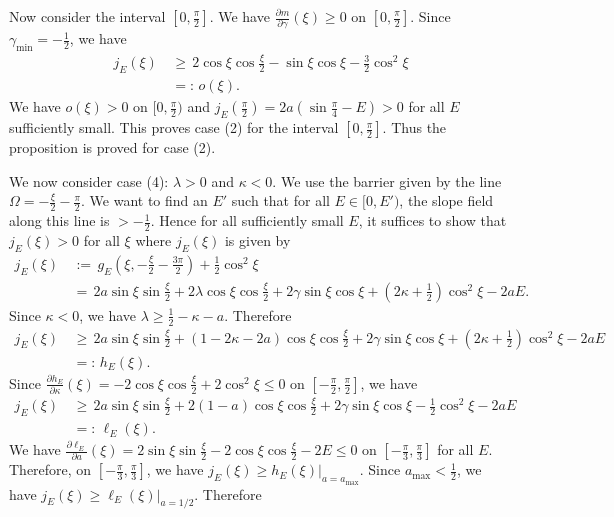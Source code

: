 \documentclass[11 pt]{article}
\renewcommand\l{\lambda}
\renewcommand\({\left(}
\renewcommand\){\right)}
\newcommand\<{\langle}
\renewcommand\>{\rangle}
\renewcommand\l{\lambda}
\newcommand\g{\gamma}
\newcommand\8{\infty}
\newcommand{\pd}{\partial}
\begin{document}
Now consider the interval $[0, \frac{\pi}{2}]$. We have $\frac{\pd m}{\pd \g}(\xi) \geq 0$ on $[0, \frac{\pi}{2}]$. Since $\g_{\text{min}} = -\frac{1}{2}$, we have
\begin{align*}
j_E(\xi) \,&\geq\,2\cos\xi \cos\frac{\xi}{2} - \sin \xi \cos \xi - \frac{3}{2}\cos^2\xi
\\
&=:\, o(\xi). 
\end{align*}
We have $o(\xi) > 0$ on $[0, \frac{\pi}{2})$ and $j_E(\frac{\pi}{2}) = 2a(\sin\frac{\pi}{4}-E) > 0$ for all $E$ sufficiently small. This proves case (2) for the interval $[0, \frac{\pi}{2}]$. Thus the proposition is proved for case (2).

We now consider case (4): $\l > 0$ and $\kappa < 0$. We  use the barrier given by the line $\Omega = -\frac{\xi}{2} - \frac{\pi}{2}$. We want to find an $E'$ such that for all $E \in [0,E')$, the slope field along this line is $>- \frac{1}{2}$. Hence for all sufficiently small $E$, it suffices to show that $j_E(\xi) > 0$ for all $\xi$ where $j_E(\xi)$ is given by    
\begin{align*}
j_E(\xi) \,&:=\, g_E\left(\xi, -\frac{\xi}{2} - \frac{3\pi}{2}\right) + \frac{1}{2}\cos^2\xi
\\
&=\, 2a\sin\xi \sin \frac{\xi}{2} + 2\l \cos \xi \cos \frac{\xi}{2} + 2\gamma\sin \xi \cos\xi + (2\kappa + \frac{1}{2})\cos^2\xi -2aE.
\end{align*}
Since $\kappa < 0$, we have $\l \geq \frac{1}{2} - \kappa - a$.  Therefore
\begin{align*}
j_E(\xi) \,&\geq\, 2a\sin \xi \sin \frac{\xi}{2} + (1 - 2\kappa - 2a) \cos \xi \cos \frac{\xi}{2} + 2\gamma \sin \xi \cos \xi + (2\kappa + \frac{1}{2})\cos^2 \xi - 2aE
\\
&=:\, h_E(\xi). 
\end{align*}
Since $\frac{\pd h_E}{\pd \kappa}(\xi) = -2\cos \xi \cos \frac{\xi}{2} + 2 \cos^2\xi \leq 0$ on $[-\frac{\pi}{2}, \frac{\pi}{2}]$, we have 
\begin{align*}
j_E(\xi) \,&\geq\, 2a\sin \xi \sin \frac{\xi}{2} + 2(1-a)\cos \xi \cos \frac{\xi}{2} + 2\gamma \sin \xi \cos \xi - \frac{1}{2}\cos^2\xi - 2aE
\\
&=:\,\ell_E(\xi).
\end{align*}
We have $\frac{\pd \ell_{E}}{\pd a}(\xi) = 2\sin\xi \sin \frac{\xi}{2} -2\cos\xi\cos\frac{\xi}{2} - 2E \leq 0$ on $[-\frac{\pi}{3}, \frac{\pi}{3}]$ for all $E$. Therefore, on $[-\frac{\pi}{3}, \frac{\pi}{3}]$, we have $j_E(\xi) \geq h_E(\xi)|_{a = a_\text{max}}$. Since $a_\text{max} < \frac{1}{2}$, we have $j_E(\xi) \geq \ell_E(\xi)|_{a = 1/2}$. Therefore
\end{document}

